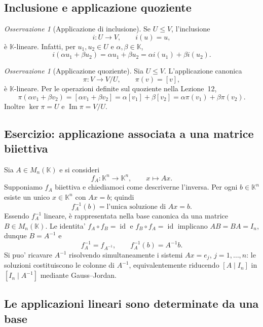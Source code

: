 \documentclass[11pt,a4paper]{article}
\newcommand{\KK}{\mathbb{K}}
\theoremstyle{plain}
\theoremstyle{definition}
\theoremstyle{remark}
\newtheorem{oss}[prop]{Osservazione}
\begin{document}
\subsection{Inclusione e applicazione quoziente}

\begin{oss}[Applicazione di inclusione]
Se $U\leq V$, l'inclusione
\[
 i:U\longrightarrow V,\qquad i(u)=u,
\]
è $\KK$-lineare. Infatti, per $u_1,u_2\in U$ e
$\alpha,\beta\in\KK$,
\[
 i(\alpha u_1+\beta u_2)
 =\alpha u_1+\beta u_2
 =\alpha i(u_1)+\beta i(u_2).
\]
\end{oss}

\begin{oss}[Applicazione quoziente]
Sia $U\leq V$. L'applicazione canonica
\[
 \pi:V\longrightarrow V/U,\qquad \pi(v)=[v],
\]
è $\KK$-lineare. Per le operazioni definite sul quoziente nella
Lezione~12,
\[
 \pi(\alpha v_1+\beta v_2)
 =[\alpha v_1+\beta v_2]
 =\alpha[v_1]+\beta[v_2]
 =\alpha\pi(v_1)+\beta\pi(v_2).
\]
Inoltre $\ker\pi=U$ e $\operatorname{Im}\pi=V/U$.
\end{oss}

\subsection{Esercizio: applicazione associata a una matrice biiettiva}

Sia $A\in M_n(\KK)$ e si consideri
\[
 f_A:\KK^n\longrightarrow\KK^n,\qquad x\longmapsto Ax.
\]
Supponiamo $f_A$ biiettiva e chiediamoci come descriverne l'inversa.
Per ogni $b\in\KK^n$ esiste un unico $x\in\KK^n$ con $Ax=b$;
quindi
\[
 \boxed{f_A^{-1}(b)=\text{l'unica soluzione di }Ax=b.}
\]
Essendo $f_A^{-1}$ lineare, è rappresentata nella base canonica da
una matrice $B\in M_n(\KK)$. Le identita'
$f_A\circ f_B=\operatorname{id}$ e
$f_B\circ f_A=\operatorname{id}$ implicano
$AB=BA=I_n$, dunque $B=A^{-1}$ e
\[
 \boxed{f_A^{-1}=f_{A^{-1}},\qquad f_A^{-1}(b)=A^{-1}b.}
\]
Si puo' ricavare $A^{-1}$ risolvendo simultaneamente i sistemi
$Ax=e_j$, $j=1,\ldots,n$: le soluzioni costituiscono le colonne
 di $A^{-1}$, equivalentemente riducendo $[A\mid I_n]$ in
$[I_n\mid A^{-1}]$ mediante Gauss--Jordan.


\subsection{Le applicazioni lineari sono determinate da una base}
\end{document}

